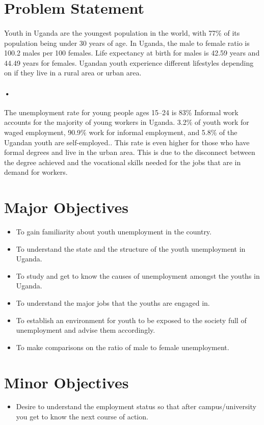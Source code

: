 \documentclass[11pt]{article}
\begin{document}
\section{Problem Statement}
\paragraph{}Youth in Uganda are the youngest population in the world, with 77$\%$ of its population being under 30 years of age. In Uganda, the male to female ratio is 100.2 males per 100 females. Life expectancy at birth for males is 42.59 years and 44.49 years for females. Ugandan youth experience different lifestyles depending on if they live in a rural area or urban area.
\paragraph{•}The unemployment rate for young people ages 15–24 is 83$\%$
Informal work accounts for the majority of young workers in Uganda. 3.2$\%$ of youth work for waged employment, 90.9$\%$ work for informal employment, and 5.8$\%$ of the Ugandan youth are self-employed.. This rate is even higher for those who have formal degrees and live in the urban area. This is due to the disconnect between the degree achieved and the vocational skills needed for the jobs that are in demand for workers.


\section{Major Objectives}
\begin{itemize}
\item To gain familiarity about youth unemployment in the country.
\item To understand the state and the structure of the youth unemployment in Uganda.
\item To study and get to know the causes of unemployment amongst the youths in Uganda.
\item To understand the major jobs that the youths are engaged in.
\item To establish an environment for youth to be exposed to the society full of unemployment and advise them accordingly. 
\item To make comparisons on the ratio of male to female unemployment.
\end{itemize}
\section{Minor Objectives}
\begin{itemize}
\item Desire to understand the employment status so that after campus/university you get to know the next course of action.
\end{itemize}
\newpage
\end{document}
